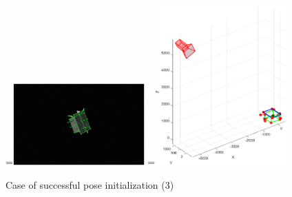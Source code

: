 \begin{figure}[htpb]
  =\hbox{\includegraphics[width=0.45\textwidth]{gfx/PoseDetermination/trial212modelMap.eps}}%
  =\hbox{\includegraphics[width=0.45\textwidth]{gfx/PoseDetermination/cameraWRTSC212.eps}}%
  {\,} \hfill
   \hfill
   \hfill
  {\,}
  \caption{Case of successful pose initialization (3)}
  \label{fig:EVVAI3}
\end{figure}

